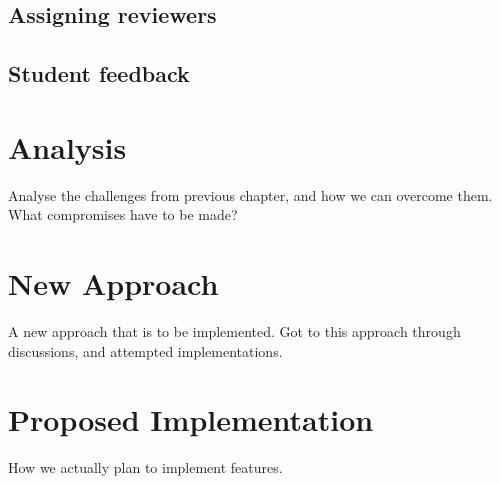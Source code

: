 \subsection{Assigning reviewers}

\subsection{Student feedback}

\section{Analysis}

Analyse the challenges from previous chapter, and how we can overcome them.
What compromises have to be made?

\section{New Approach}

A new approach that is to be implemented. Got to this approach through discussions, and attempted implementations.

\section{Proposed Implementation}

How we actually plan to implement features.